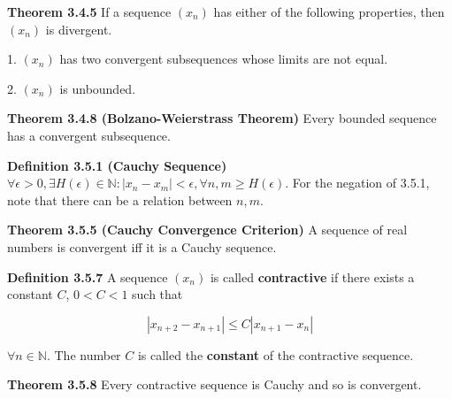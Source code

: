 \documentclass[10pt,landscape]{article}
\begin{document}
\begin{multicols}{4}
\textbf{Theorem 3.4.5} If a sequence $(x_n)$ has either of the following properties, then $(x_n)$ is divergent.

1. $(x_n)$ has two convergent subsequences whose limits are not equal.

2. $(x_n)$ is unbounded.


\textbf{Theorem 3.4.8 (Bolzano-Weierstrass Theorem)} Every bounded sequence has a convergent subsequence.


\textbf{Definition 3.5.1 (Cauchy Sequence)} $\forall \epsilon > 0, \exists H(\epsilon) \in \mathbb{N} : |x_n - x_m| < \epsilon, \forall n, m \geq H(\epsilon)$. For the negation of 3.5.1, note that there can be a relation between $n, m$.


\textbf{Theorem 3.5.5 (Cauchy Convergence Criterion)} A sequence of real numbers is convergent iff it is a Cauchy sequence.

\textbf{Definition 3.5.7} A sequence $(x_n)$ is called \textbf{contractive} if there exists a constant $C$, $0 < C < 1$ such that

$$
|x_{n+2} - x_{n+1}| \leq C |x_{n+1} - x_n|
$$

$\forall n \in \mathbb{N}$. The number $C$ is called the \textbf{constant} of the contractive sequence.

\textbf{Theorem 3.5.8} Every contractive sequence is Cauchy and so is convergent.





\end{multicols}
\end{document}
